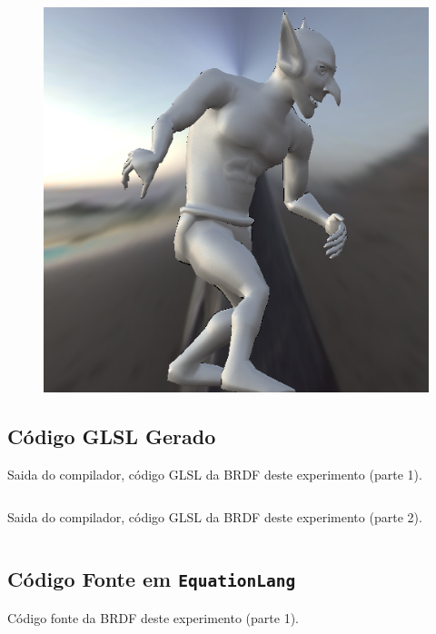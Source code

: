 \begin{figure}[H]
\endminipage\hfill
{}%
  \includegraphics[width=\linewidth]{./Imagens/brdfs/ward-goblin.png}
\endminipage
\end{figure}

\subsection{Código GLSL Gerado}
\begin{codigo}[H]
    \caption{\small Saida do compilador, código GLSL da BRDF deste experimento (parte 1). }
    \label{cod-ward-eqlang-declarations}
\begin{lstlisting}[language=C, inputencoding=utf8]
\end{lstlisting}
\end{codigo}

\begin{codigo}[H]
    \caption{\small Saida do compilador, código GLSL da BRDF deste experimento  (parte 2). }
    \label{cod-ward-eqlang}
\begin{lstlisting}[language=C, inputencoding=utf8]
\end{lstlisting}
\end{codigo}

\subsection{Código Fonte em \texttt{EquationLang}}
\begin{codigo}[H]
    \caption{\small Código fonte da BRDF deste experimento (parte 1).}
    \label{cod-ward-eqlang}
\begin{lstlisting}[language=tex, frame=none, inputencoding=utf8]
\end{lstlisting}
\end{codigo}
